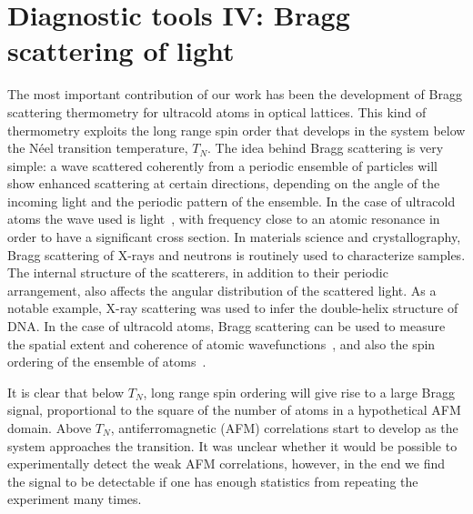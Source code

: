 \chapter{Diagnostic tools IV:  Bragg scattering of light}
\label{chap:bragg-scatt}

The most important contribution of our work has been the development of Bragg
scattering thermometry for ultracold atoms in optical lattices.  This kind of
thermometry exploits the long range spin order that develops in the system
below the N\'{e}el transition temperature, $T_{N}$.   The idea behind Bragg
scattering is very simple:  a wave scattered coherently from a periodic
ensemble of particles will show enhanced scattering at certain directions,
depending on the angle of the incoming light and the periodic pattern of the
ensemble.  In the case of ultracold atoms the wave used is
light~\cite{PhysRevLett.75.2823,Weidemueller1998}, with frequency close to an
atomic resonance in order to have a significant cross section.  In materials
science and crystallography,  Bragg scattering of X-rays and neutrons is
routinely used to characterize samples.   The internal structure of the
scatterers, in addition to their periodic arrangement,  also affects the
angular distribution of the scattered light.  As a notable example,  X-ray
scattering was used to infer the double-helix structure of DNA.  In the case of
ultracold atoms, Bragg scattering can be used to measure the spatial extent and
coherence of atomic wavefunctions~\cite{Miyake2011}, and also the spin ordering
of the ensemble of atoms~\cite{Hart2014arxiv}.

It is clear that below $T_{N}$, long range spin ordering will give rise to a
large Bragg signal, proportional to the square of the number of atoms in a
hypothetical AFM domain.   Above $T_{N}$, antiferromagnetic (AFM) correlations
start to develop as the  system approaches the transition.   It was unclear
whether it would be possible to experimentally detect  the weak AFM
correlations, however, in the end we find the signal to be detectable if one
has enough statistics from repeating the experiment many times.

